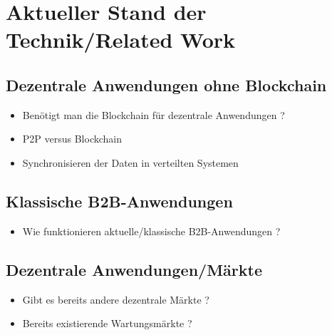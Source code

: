 \chapter{Aktueller Stand der Technik/Related Work}
\label{cha:stand-technik}

\section{Dezentrale Anwendungen ohne Blockchain}
\begin{itemize}
    \item Benötigt man die Blockchain für dezentrale Anwendungen ?
    \item P2P versus Blockchain
    \item Synchronisieren der Daten in verteilten Systemen
\end{itemize}

\section{Klassische B2B-Anwendungen}
\begin{itemize}
    \item Wie funktionieren aktuelle/klassische B2B-Anwendungen ?
\end{itemize}

\section{Dezentrale Anwendungen/Märkte}
\begin{itemize}
    \item Gibt es bereits andere dezentrale Märkte ? 
    \item Bereits existierende Wartungsmärkte ?
\end{itemize}


